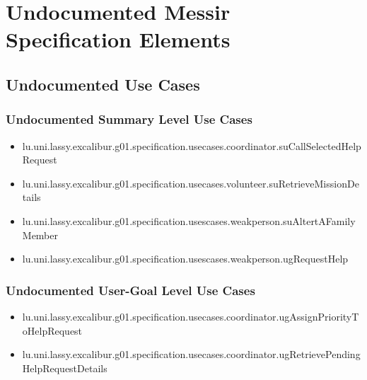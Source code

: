 	
\chapter{Undocumented Messir Specification Elements}


\section[Undocumented Use Cases]{Undocumented Use Cases}

\subsection[Undocumented Use Cases - Summary Level]{Undocumented Summary Level Use Cases}
\begin{itemize}
\item lu.uni.lassy.excalibur.g01.specification.usecases.coordinator.suCallSelectedHelpRequest 
\item lu.uni.lassy.excalibur.g01.specification.usecases.volunteer.suRetrieveMissionDetails 
\item lu.uni.lassy.excalibur.g01.specification.usescases.weakperson.suAltertAFamilyMember 
\item lu.uni.lassy.excalibur.g01.specification.usescases.weakperson.ugRequestHelp 
\end{itemize}

\subsection[Undocumented Use Cases - User-Goal Level]{Undocumented User-Goal Level Use Cases}
\begin{itemize}
\item lu.uni.lassy.excalibur.g01.specification.usecases.coordinator.ugAssignPriorityToHelpRequest 
\item lu.uni.lassy.excalibur.g01.specification.usecases.coordinator.ugRetrievePendingHelpRequestDetails 
\end{itemize}

